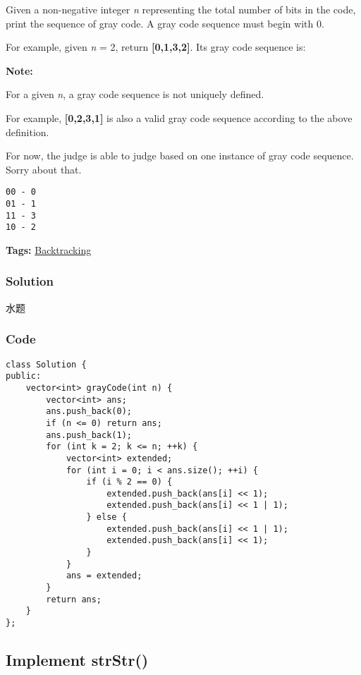 \documentclass{article}
\begin{document}
\begin{CJK*}{UTF8}{gkai}
Given a non-negative integer \emph{n} representing the total number of bits in the code, print the sequence of gray code. A gray code sequence must begin with 0.

For example, given \emph{n} = 2, return \textbf{[0,1,3,2]}. Its gray code sequence is:

\textbf{Note:}


For a given \emph{n}, a gray code sequence is not uniquely defined.

For example, \textbf{[0,2,3,1]} is also a valid gray code sequence according to the above definition.

For now, the judge is able to judge based on one instance of gray code sequence. Sorry about that.

\begin{verbatim}
00 - 0
01 - 1
11 - 3
10 - 2
\end{verbatim}

\textbf{Tags: }
\hyperref[ Backtracking ]{ Backtracking }



\subsubsection*{Solution}
水题

\subsubsection*{Code}
\begin{lstlisting}
class Solution {
public:
    vector<int> grayCode(int n) {
        vector<int> ans;
        ans.push_back(0);
        if (n <= 0) return ans;
        ans.push_back(1);
        for (int k = 2; k <= n; ++k) {
            vector<int> extended;
            for (int i = 0; i < ans.size(); ++i) {
                if (i % 2 == 0) {
                    extended.push_back(ans[i] << 1);
                    extended.push_back(ans[i] << 1 | 1);
                } else {
                    extended.push_back(ans[i] << 1 | 1);
                    extended.push_back(ans[i] << 1);
                }
            }
            ans = extended;
        } 
        return ans;
    }
}; 
\end{lstlisting}


\subsection{ Implement strStr() }
\label{ Implement strStr() }


\end{CJK*}
\end{document}

